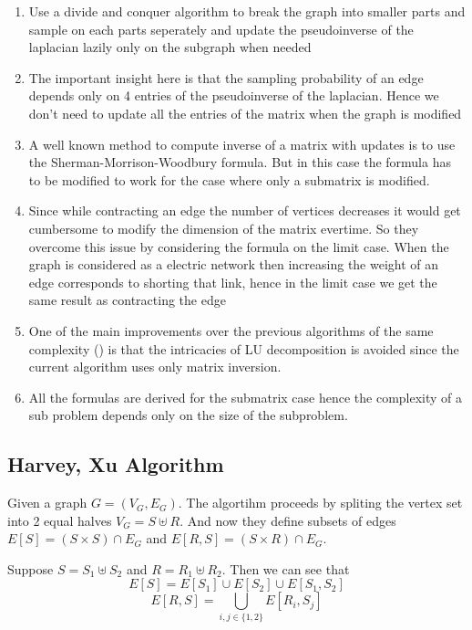 \begin{enumerate}
 \item Use a divide and conquer algorithm to break the graph into smaller parts and sample on each parts seperately and update the pseudoinverse of the laplacian lazily only on the subgraph when needed
 \item The important insight here is that the sampling probability of an edge depends only on 4 entries of the pseudoinverse of the laplacian. Hence we don't need to update all the entries of the matrix when the graph is modified
 \item A well known method to compute inverse of a matrix with updates is to use the Sherman-Morrison-Woodbury formula. But in this case the formula has to be modified to work for the case where only a submatrix is modified.
 \item Since while contracting an edge the number of vertices decreases it would get cumbersome to modify the dimension of the matrix evertime. So they overcome this issue by considering the formula on the limit case. When the graph is considered as a electric network then increasing the weight of an edge corresponds to shorting that link, hence in the limit case we get the same result as contracting the edge
\item One of the main improvements over the previous algorithms of the same complexity (\citet{COLBOURN1996268}) is that the intricacies of LU decomposition is avoided since the current algorithm uses only matrix inversion.
\item All the formulas are derived for the submatrix case hence the complexity of a sub problem depends only on the size of the subproblem.
\end{enumerate}



\subsection{Harvey, Xu Algorithm}

Given a graph $G = (V_G, E_G)$. The algortihm proceeds by spliting the vertex set into 2 equal halves $V_G = S \uplus R$. And now they define subsets of edges $E[S] = (S \times S) \cap E_G$ and $E[R, S] = (S \times R) \cap E_G$. 

Suppose $S = S_1 \uplus S_2$ and $R = R_1 \uplus R_2$. Then we can see that 
$$ E[S] = E[S_1] \cup E[S_2] \cup E[S_1, S_2] $$ 
$$ E[R, S] = \bigcup\limits_{i,j \in \{1,2\} } E[R_i, S_j] $$

